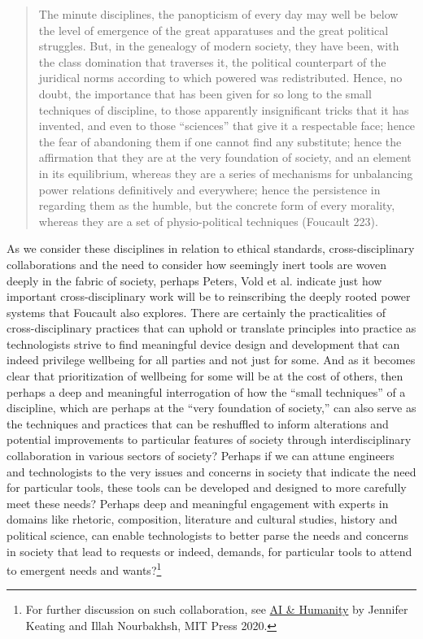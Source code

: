 \documentclass[11pt,dvipdfm]{article}
\begin{document}
\begin{quote}
	The minute disciplines, the panopticism of every day may well be below the level of emergence of the great apparatuses and the great political struggles.  But, in the genealogy of modern society, they have been, with the class domination that traverses it, the political counterpart of the juridical norms according to which powered was redistributed.  Hence, no doubt, the importance that has been given for so long to the small techniques of discipline, to those apparently insignificant tricks that it has invented, and even to those ``sciences'' that give it a respectable face; hence the fear of abandoning them if one cannot find any substitute; hence the affirmation that they are at the very foundation of society, and an element in its equilibrium, whereas they are a series of mechanisms for unbalancing power relations definitively and everywhere; hence the persistence in regarding them as the humble, but the concrete form of every morality, whereas they are a set of physio-political techniques (Foucault 223).  
\end{quote} 
As we consider these disciplines in relation to ethical standards, cross-disciplinary collaborations and the need to consider how seemingly inert tools are woven deeply in the fabric of society, perhaps Peters, Vold et al. indicate just how important cross-disciplinary work will be to reinscribing the deeply rooted power systems that Foucault also explores.  There are certainly the practicalities of cross-disciplinary practices that can uphold or translate principles into practice as technologists strive to find meaningful device design and development that can indeed privilege wellbeing for all parties and not just for some.  And as it becomes clear that prioritization of wellbeing for some will be at the cost of others, then perhaps a deep and meaningful interrogation of how the “small techniques” of a discipline, which are perhaps at the “very foundation of society,” can also serve as the techniques and practices that can be reshuffled to inform alterations and potential improvements to particular features of society through interdisciplinary collaboration in various sectors of society?  Perhaps if we can attune engineers and technologists to the very issues and concerns in society that indicate the need for particular tools, these tools can be developed and designed to more carefully meet these needs?  Perhaps deep and meaningful engagement with experts in domains like rhetoric, composition, literature and cultural studies, history and political science, can enable technologists to better parse the needs and concerns in society that lead to requests or indeed, demands, for particular tools to attend to emergent needs and wants?\footnote{For further discussion on such collaboration, see \underline{AI \& Humanity} by Jennifer Keating and Illah Nourbakhsh, MIT Press 2020.}    
\end{document}
